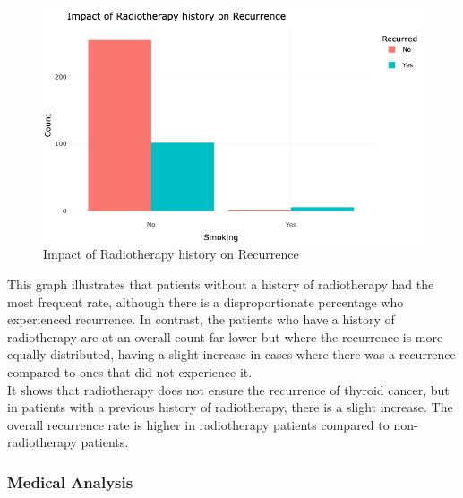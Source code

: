 \documentclass[12pt]{article}
\begin{document}
\begin{enumerate}
        \begin{figure}[h]
        \vspace{5pt}
        \centering
        \includegraphics[width=1.1\textwidth]{radio and reccure.png}  
        \caption{Impact of Radiotherapy history on Recurrence}
            \label{fig:example}
       \vspace{0.5cm}
    \end{figure}

This graph illustrates that patients without a history of radiotherapy had the most frequent rate, although there is a disproportionate percentage who experienced recurrence. In contrast, the patients who have a history of radiotherapy are at an overall count far lower but where the recurrence is more equally distributed, having a slight increase in cases where there was a recurrence compared to ones that did not experience it.\\ 



\hspace{9pt} It shows that radiotherapy does not ensure the recurrence of thyroid cancer, but in patients with a previous history of radiotherapy, there is a slight increase. The overall recurrence rate is higher in radiotherapy patients compared to non-radiotherapy patients. 

\end{enumerate}
\newpage

\subsubsection{Medical Analysis}
\end{document}

